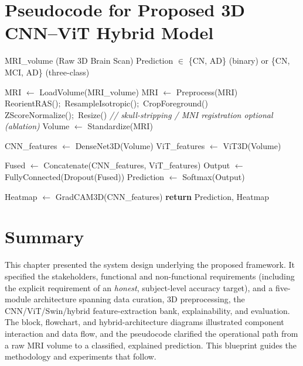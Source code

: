 \section{Pseudocode for Proposed 3D CNN--ViT Hybrid Model}
\begin{algorithm}[H]
\caption{Hybrid 3D CNN--ViT Classification Pipeline}
\begin{algorithmic}[1]
\Require MRI\_volume (Raw 3D Brain Scan)
\Ensure Prediction $\in$ \{CN, AD\} (binary) or \{CN, MCI, AD\} (three-class)

\State MRI $\gets$ LoadVolume(MRI\_volume)
\State MRI $\gets$ Preprocess(MRI)
\Statex \quad ReorientRAS();\ ResampleIsotropic();\ CropForeground()
\Statex \quad ZScoreNormalize();\ Resize()
\Statex \quad \textit{// skull-stripping / MNI registration optional (ablation)}
\State Volume $\gets$ Standardize(MRI)

\State CNN\_features $\gets$ DenseNet3D(Volume) 
\State ViT\_features $\gets$ ViT3D(Volume) 

\State Fused $\gets$ Concatenate(CNN\_features, ViT\_features)
\State Output $\gets$ FullyConnected(Dropout(Fused))
\State Prediction $\gets$ Softmax(Output)

\State Heatmap $\gets$ GradCAM3D(CNN\_features)
\State \textbf{return} Prediction, Heatmap
\end{algorithmic}
\end{algorithm}

\section{Summary}
This chapter presented the system design underlying the proposed framework. It specified the stakeholders, functional and non-functional requirements (including the explicit requirement of an \emph{honest}, subject-level accuracy target), and a five-module architecture spanning data curation, 3D preprocessing, the CNN/ViT/Swin/hybrid feature-extraction bank, explainability, and evaluation. The block, flowchart, and hybrid-architecture diagrams illustrated component interaction and data flow, and the pseudocode clarified the operational path from a raw MRI volume to a classified, explained prediction. This blueprint guides the methodology and experiments that follow.
